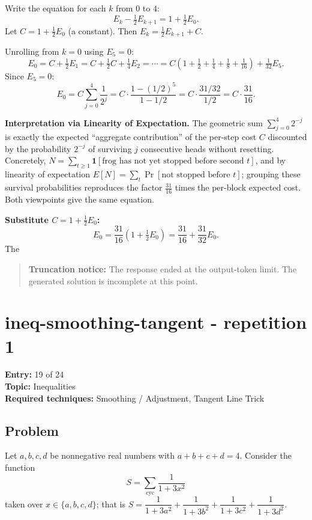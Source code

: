 \documentclass[
  11pt,
  letterpaper,
]{article}
\begin{document}
Write the equation for each \(k\) from \(0\) to \(4\): \[
E_k - \tfrac12 E_{k+1} = 1 + \tfrac12 E_0.
\] Let \(C = 1 + \tfrac12 E_0\) (a constant). Then
\(E_k = \tfrac12 E_{k+1} + C\).

Unrolling from \(k=0\) using \(E_5 = 0\): \[
E_0 = C + \tfrac12 E_1 = C + \tfrac12 C + \tfrac14 E_2 = \cdots
= C\left(1 + \tfrac12 + \tfrac14 + \tfrac18 + \tfrac1{16}\right) + \tfrac1{32} E_5.
\] Since \(E_5 = 0\): \[
E_0 = C \sum_{j=0}^{4} \frac{1}{2^{j}} = C \cdot \frac{1 - (1/2)^5}{1 - 1/2} = C \cdot \frac{31/32}{1/2} = C \cdot \frac{31}{16}.
\]

\textbf{Interpretation via Linearity of Expectation.} The geometric sum
\(\sum_{j=0}^4 2^{-j}\) is exactly the expected ``aggregate
contribution'' of the per-step cost \(C\) discounted by the probability
\(2^{-j}\) of surviving \(j\) consecutive heads without resetting.
Concretely,
\(N = \sum_{t\ge 1}\mathbf{1}[\text{frog has not yet stopped before second }t]\),
and by linearity of expectation
\(E[N]=\sum_t \Pr[\text{not stopped before }t]\); grouping these
survival probabilities reproduces the factor \(\tfrac{31}{16}\) times
the per-block expected cost. Both viewpoints give the same equation.

\textbf{Substitute \(C = 1 + \tfrac12 E_0\):} \[
E_0 = \frac{31}{16}\left(1 + \tfrac12 E_0\right) = \frac{31}{16} + \frac{31}{32} E_0.
\] The

\begin{quote}
\textbf{Truncation notice:} The response ended at the output-token
limit. The generated solution is incomplete at this point.
\end{quote}

\clearpage

\section{ineq-smoothing-tangent - repetition
1}\label{ineq-smoothing-tangent---repetition-1}

\textbf{Entry:} 19 of 24\\
\textbf{Topic:} Inequalities\\
\textbf{Required techniques:} Smoothing / Adjustment, Tangent Line Trick

\subsection{Problem}\label{problem-18}

Let \(a,b,c,d\) be nonnegative real numbers with \(a+b+c+d=4\). Consider
the function \[
S=\sum_{\text{cyc}} \frac{1}{1+3x^2}
\] taken over \(x\in\{a,b,c,d\}\); that is
\(S=\dfrac{1}{1+3a^2}+\dfrac{1}{1+3b^2}+\dfrac{1}{1+3c^2}+\dfrac{1}{1+3d^2}\).
\end{document}
